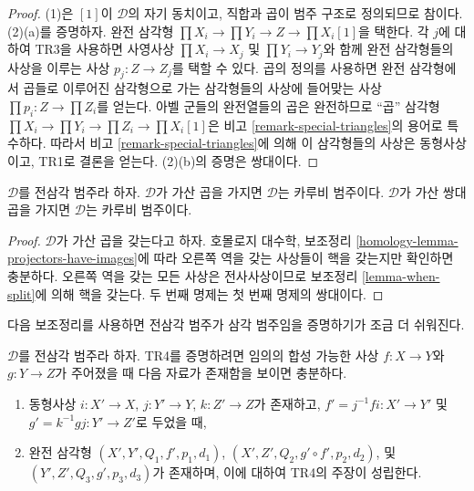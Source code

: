 \begin{proof}
(1)은 $[1]$이 $\mathcal{D}$의 자기 동치이고, 직합과 곱이 범주 구조로
정의되므로 참이다. (2)(a)를 증명하자. 완전 삼각형
$\prod X_i \to \prod Y_i \to Z \to \prod X_i[1]$을 택한다.
각 $j$에 대하여 TR3을 사용하면 사영사상 $\prod X_i \to X_j$ 및
$\prod Y_i \to Y_j$와 함께 완전 삼각형들의 사상을 이루는 사상
$p_j : Z \to Z_j$를 택할 수 있다. 곱의 정의를 사용하면 완전 삼각형에서
곱들로 이루어진 삼각형으로 가는 삼각형들의 사상에 들어맞는 사상
$\prod p_i : Z \to \prod Z_i$를 얻는다. 아벨 군들의 완전열들의 곱은
완전하므로 “곱” 삼각형
$\prod X_i \to \prod Y_i \to \prod Z_i \to \prod X_i[1]$은
비고 \ref{remark-special-triangles}의 용어로 특수하다.
따라서 비고 \ref{remark-special-triangles}에 의해 이 삼각형들의 사상은
동형사상이고, TR1로 결론을 얻는다. (2)(b)의 증명은 쌍대이다.
\end{proof}

\begin{lemma}
\label{lemma-projectors-have-images-triangulated}
$\mathcal{D}$를 전삼각 범주라 하자.
$\mathcal{D}$가 가산 곱을 가지면 $\mathcal{D}$는 카루비 범주이다.
$\mathcal{D}$가 가산 쌍대곱을 가지면 $\mathcal{D}$는 카루비 범주이다.
\end{lemma}

\begin{proof}
$\mathcal{D}$가 가산 곱을 갖는다고 하자. 호몰로지 대수학, 보조정리
\ref{homology-lemma-projectors-have-images}에 따라 오른쪽 역을 갖는
사상들이 핵을 갖는지만 확인하면 충분하다. 오른쪽 역을 갖는 모든 사상은
전사사상이므로 보조정리 \ref{lemma-when-split}에 의해 핵을 갖는다.
두 번째 명제는 첫 번째 명제의 쌍대이다.
\end{proof}

\noindent
다음 보조정리를 사용하면 전삼각 범주가 삼각 범주임을 증명하기가
조금 더 쉬워진다.

\begin{lemma}
\label{lemma-easier-axiom-four}
$\mathcal{D}$를 전삼각 범주라 하자. TR4를 증명하려면 임의의 합성 가능한
사상 $f : X \to Y$와 $g : Y \to Z$가 주어졌을 때 다음 자료가
존재함을 보이면 충분하다.
\begin{enumerate}
\item 동형사상 $i : X' \to X$, $j : Y' \to Y$, $k : Z' \to Z$가
존재하고, $f' = j^{-1}fi : X' \to Y'$ 및
$g' = k^{-1}gj : Y' \to Z'$로 두었을 때,
\item 완전 삼각형
$(X', Y', Q_1, f', p_1, d_1)$,
$(X', Z', Q_2, g' \circ f', p_2, d_2)$,
및
$(Y', Z', Q_3, g', p_3, d_3)$가 존재하며, 이에 대하여 TR4의
주장이 성립한다.
\end{enumerate}
\end{lemma}

